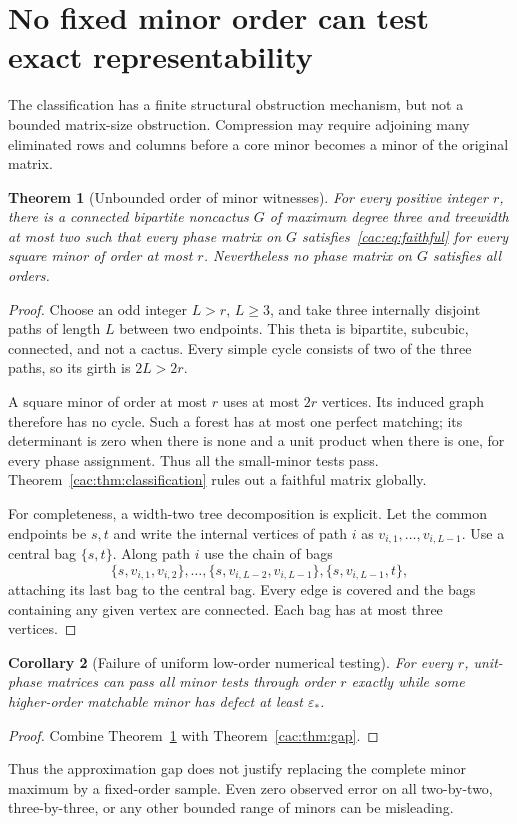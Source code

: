 \documentclass[11pt]{article}
\numberwithin{equation}{section}
\newtheorem{theorem}{Theorem}[section]
\newtheorem{corollary}[theorem]{Corollary}
\theoremstyle{definition}
\newcommand{\epsstar}{\varepsilon_*}
\begin{document}
\section{No fixed minor order can test exact representability}
\label{cac:sec:local}

The classification has a finite structural obstruction mechanism, but not a bounded matrix-size obstruction. Compression may require adjoining many eliminated rows and columns before a core minor becomes a minor of the original matrix.

\begin{theorem}[Unbounded order of minor witnesses]
\label{cac:thm:bounded}
For every positive integer $r$, there is a connected bipartite noncactus $G$ of maximum degree three and treewidth at most two such that \emph{every} phase matrix on $G$ satisfies~\eqref{cac:eq:faithful} for every square minor of order at most $r$. Nevertheless no phase matrix on $G$ satisfies all orders.
\end{theorem}
\begin{proof}
Choose an odd integer $L>r$, $L\ge3$, and take three internally disjoint paths of length $L$ between two endpoints. This theta is bipartite, subcubic, connected, and not a cactus. Every simple cycle consists of two of the three paths, so its girth is $2L>2r$.

A square minor of order at most $r$ uses at most $2r$ vertices. Its induced graph therefore has no cycle. Such a forest has at most one perfect matching; its determinant is zero when there is none and a unit product when there is one, for every phase assignment. Thus all the small-minor tests pass. Theorem~\ref{cac:thm:classification} rules out a faithful matrix globally.

For completeness, a width-two tree decomposition is explicit. Let the common endpoints be $s,t$ and write the internal vertices of path $i$ as $v_{i,1},\ldots,v_{i,L-1}$. Use a central bag $\{s,t\}$. Along path $i$ use the chain of bags
\[
 \{s,v_{i,1},v_{i,2}\},\ldots,
 \{s,v_{i,L-2},v_{i,L-1}\},
 \{s,v_{i,L-1},t\},
\]
attaching its last bag to the central bag. Every edge is covered and the bags containing any given vertex are connected. Each bag has at most three vertices.
\end{proof}

\begin{corollary}[Failure of uniform low-order numerical testing]
For every $r$, unit-phase matrices can pass all minor tests through order $r$ exactly while some higher-order matchable minor has defect at least $\epsstar$.
\end{corollary}
\begin{proof}
Combine Theorem~\ref{cac:thm:bounded} with Theorem~\ref{cac:thm:gap}.
\end{proof}
Thus the approximation gap does not justify replacing the complete minor maximum by a fixed-order sample. Even zero observed error on all two-by-two, three-by-three, or any other bounded range of minors can be misleading.
\end{document}
